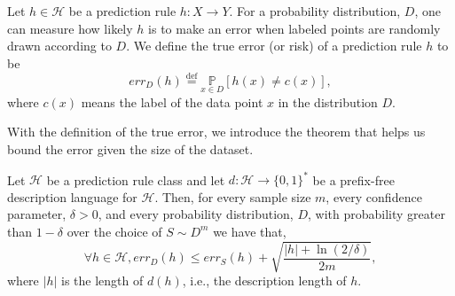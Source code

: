 \begin{definition}
    Let $h\in\mathcal{H}$ be a prediction rule $h: X\rightarrow Y$. For a probability distribution, $D$, one can measure how likely $h$ is to make an error when labeled points are randomly drawn according to $D$. We define the true error (or risk) of a prediction rule $h$ to be
    \begin{equation}
        err_D(h)\overset{\mathrm{def}}{=}\underset{x\in D}{\mathbb{P}}[h(x)\neq c(x)],
    \end{equation}
    where $c(x)$ means the label of the data point $x$ in the distribution $D$.
\end{definition}
With the definition of the true error, we introduce the theorem that helps us bound the error given the size of the dataset. 
\begin{theorem}
    Let $\mathcal{H}$ be a prediction rule class and let $d:\mathcal{H} \rightarrow \{0, 1\}^*$ be a prefix-free description language for $\mathcal{H}$. Then, for every sample size $m$, every confidence parameter, $\delta > 0$, and every probability distribution, $D$, with probability greater than $1-\delta$ over the choice of $S\sim D^m$ we have that,
    \begin{equation}
        \forall h\in\mathcal{H}, err_D(h)\leq err_S(h)+\sqrt{\frac{|h|+\ln{(2/\delta)}}{2m}},
    \end{equation}
    where $|h|$ is the length of $d(h)$, i.e., the description length of $h$.
\label{theorem:or}
\end{theorem}


